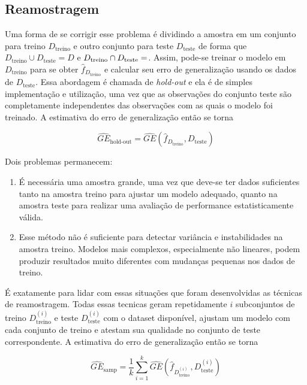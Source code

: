 \documentclass[
  12pt,
  oneside,
  a4paper,
  chapter=TITLE,
  section=TITLE,
  brazil]{abntex2}
\begin{document}
\hypertarget{reamostragem}{%
\subsection{Reamostragem}\label{reamostragem}}

Uma forma de se corrigir esse problema é dividindo a amostra em um
conjunto para treino \(D_\text{treino}\) e outro conjunto para teste
\(D_\text{teste}\) de forma que
\(D_\text{treino} \cup D_\text{teste} = D\) e
\(D_\text{treino} \cap D_\text{teste} = \empty\). Assim, pode-se treinar
o modelo em \(D_\text{treino}\) para se obter
\(\hat{f}_{D_{\text{treino}}}\) e calcular seu erro de generalização
usando os dados de \(D_\text{teste}\). Essa abordagem é chamada de
\emph{hold-out} e ela é de simples implementação e utilização, uma vez
que as observações do conjunto teste são completamente independentes das
observações com as quais o modelo foi treinado. A estimativa do erro de
generalização então se torna

\[\widehat{GE}_\text{hold-out} = \widehat{GE}(\hat{f}_{D_{\text{treino}}}, D_{\text{teste}})\]

Dois problemas permanecem:

\begin{enumerate}
\def\labelenumi{\arabic{enumi}.}
\item
  É necessária uma amostra grande, uma vez que deve-se ter dados
  suficientes tanto na amostra treino para ajustar um modelo adequado,
  quanto na amostra teste para realizar uma avaliação de performance
  estatisticamente válida.
\item
  Esse método não é suficiente para detectar variância e instabilidades
  na amostra treino. Modelos mais complexos, especialmente não lineares,
  podem produzir resultados muito diferentes com mudanças pequenas nos
  dados de treino.
\end{enumerate}

É exatamente para lidar com essas situações que foram desenvolvidas as
técnicas de reamostragem. Todas essas tecnicas geram repetidamente \(i\)
subconjuntos de treino \(D_{\text{treino}}^{(i)}\) e teste
\(D_{\text{teste}}^{(i)}\) com o dataset disponível, ajustam um modelo
com cada conjunto de treino e atestam sua qualidade no conjunto de teste
correspondente. A estimativa do erro de generalização então se torna

\[\widehat{GE}_\text{samp} = \frac{1}{k}\sum_{i=1}^{k}\widehat{GE}(\hat{f}_{D_{\text{treino}}^{(i)}}, D_{\text{teste}}^{(i)}) \tag{2}\]
\end{document}
